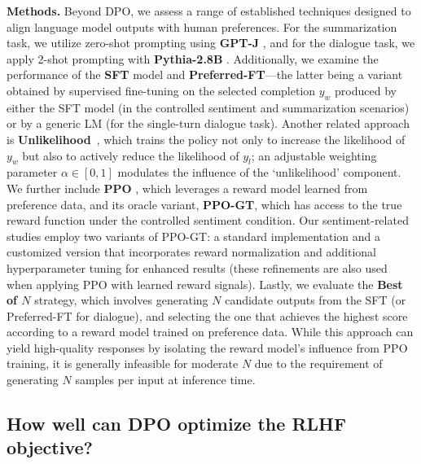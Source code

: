 \textbf{Methods.} Beyond DPO, we assess a range of established techniques designed to align language model outputs with human preferences. For the summarization task, we utilize zero-shot prompting using \textbf{GPT-J} \citep{gpt-j}, and for the dialogue task, we apply 2-shot prompting with \textbf{Pythia-2.8B} \citep{biderman2023pythia}. Additionally, we examine the performance of the \textbf{SFT} model and \textbf{Preferred-FT}—the latter being a variant obtained by supervised fine-tuning on the selected completion $y_w$ produced by either the SFT model (in the controlled sentiment and summarization scenarios) or by a generic LM (for the single-turn dialogue task). Another related approach is \textbf{Unlikelihood}~\citep{welleck2019neural}, which trains the policy not only to increase the likelihood of $y_w$ but also to actively reduce the likelihood of $y_l$; an adjustable weighting parameter $\alpha\in[0,1]$ modulates the influence of the ‘unlikelihood’ component. We further include \textbf{PPO} \citep{schulman2017proximal}, which leverages a reward model learned from preference data, and its oracle variant, \textbf{PPO-GT}, which has access to the true reward function under the controlled sentiment condition. Our sentiment-related studies employ two variants of PPO-GT: a standard implementation \cite{leandro_von_werra_2023_7790115} and a customized version that incorporates reward normalization and additional hyperparameter tuning for enhanced results (these refinements are also used when applying PPO with learned reward signals). Lastly, we evaluate the \textbf{Best of $N$} strategy, which involves generating $N$ candidate outputs from the SFT (or Preferred-FT for dialogue), and selecting the one that achieves the highest score according to a reward model trained on preference data. While this approach can yield high-quality responses by isolating the reward model's influence from PPO training, it is generally infeasible for moderate $N$ due to the requirement of generating $N$ samples per input at inference time.

\subsection{How well can DPO optimize the RLHF objective?}

